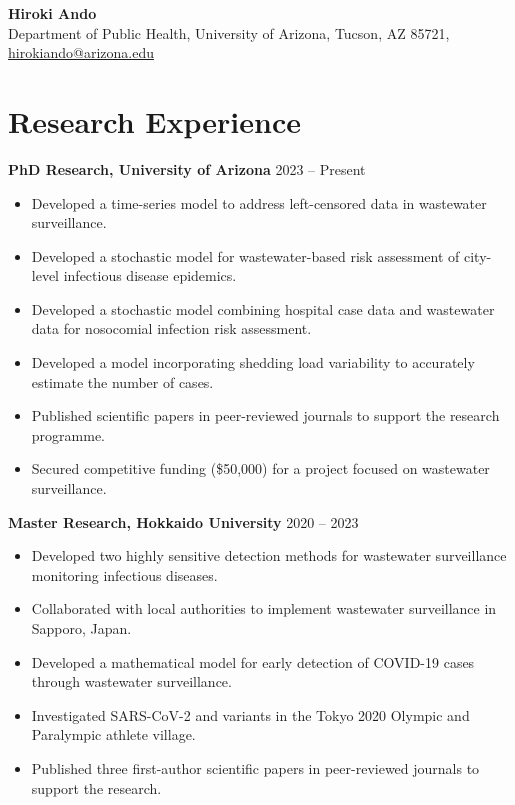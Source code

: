 \documentclass[11pt,a4paper]{article}
\begin{document}
{\LARGE \textbf{Hiroki Ando}} \\
{\small %
Department of Public Health, University of Arizona, Tucson, AZ 85721, \href{mailto:hirokiando@arizona.edu}{hirokiando@arizona.edu}
} %


\vspace{0pt}
\section{Research Experience}

\textbf{PhD Research, University of Arizona } \hfill 2023 -- Present \\

\begin{itemize}[leftmargin=1.2em, itemsep=2pt]
    \small %
    \item Developed a time-series model to address left-censored data in wastewater surveillance.
    \item Developed a stochastic model for wastewater-based risk assessment of city-level infectious disease epidemics.
    \item Developed a stochastic model combining hospital case data and wastewater data for nosocomial infection risk assessment. %
    \item Developed a model incorporating shedding load variability to accurately estimate the number of cases. %
    \item Published scientific papers in peer-reviewed journals to support the research programme.
    \item Secured competitive funding (\$50,000) for a project focused on wastewater surveillance.
\end{itemize}

\vspace{10pt}
\textbf{Master Research, Hokkaido University} \hfill 2020 -- 2023 \\

\begin{itemize}[leftmargin=1.2em, itemsep=2pt]
    \small
    \item Developed two highly sensitive detection methods for wastewater surveillance monitoring infectious diseases.
    \item Collaborated with local authorities to implement wastewater surveillance in Sapporo, Japan.
    \item Developed a mathematical model for early detection of COVID-19 cases through wastewater surveillance.
    \item Investigated SARS-CoV-2 and variants in the Tokyo 2020 Olympic and Paralympic athlete village. %
    \item Published three first-author scientific papers in peer-reviewed journals to support the research.
\end{itemize}
\end{document}
